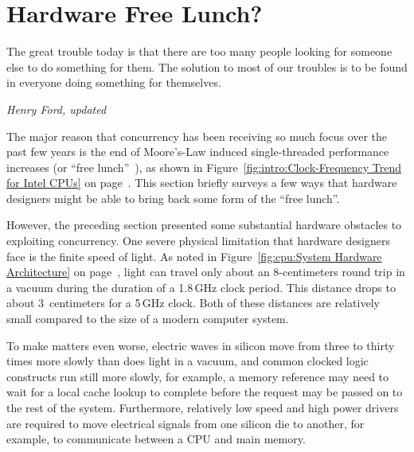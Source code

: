 
\section{Hardware Free Lunch?}
\label{sec:cpu:Hardware Free Lunch?}
%
\epigraph{The great trouble today is that there are too many people looking
	  for someone else to do something for them.
	  The solution to most of our troubles is to be found in everyone
	  doing something for themselves.}
	 {\emph{Henry Ford, updated}}

The major reason that concurrency has been receiving so much focus over
the past few years is the end of Moore's-Law induced single-threaded
performance increases
(or ``free lunch''~\cite{HerbSutter2008EffectiveConcurrency}),
as shown in
Figure~\ref{fig:intro:Clock-Frequency Trend for Intel CPUs} on
page~\pageref{fig:intro:Clock-Frequency Trend for Intel CPUs}.
This section briefly surveys a few ways that hardware designers
might be able to bring back some form of the ``free lunch''.

However, the preceding section presented some substantial hardware
obstacles to exploiting concurrency.
One severe physical limitation that hardware designers face is the
finite speed of light.
As noted in
Figure~\ref{fig:cpu:System Hardware Architecture} on
page~\pageref{fig:cpu:System Hardware Architecture},
light can travel only about an 8-centimeters round trip
in a vacuum during the duration of a 1.8\,GHz clock period.
This distance drops to about 3~centimeters for a 5\,GHz clock.
Both of these distances are relatively small compared to the size
of a modern computer system.

To make matters even worse, electric waves in silicon move from three to
thirty times more slowly than does light in a vacuum, and common
clocked logic constructs run still more slowly, for example, a
memory reference may need to wait for a local cache lookup to complete
before the request may be passed on to the rest of the system.
Furthermore, relatively low speed and high power drivers are required
to move electrical signals from one silicon die to another, for example,
to communicate between a CPU and main memory.


